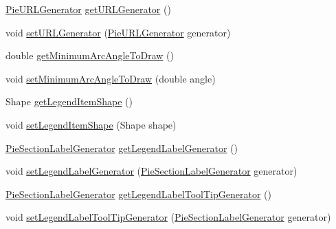 \begin{DoxyCompactItemize}
\item 
\mbox{\hyperlink{interfaceorg_1_1jfree_1_1chart_1_1urls_1_1_pie_u_r_l_generator}{Pie\+U\+R\+L\+Generator}} \mbox{\hyperlink{classorg_1_1jfree_1_1chart_1_1plot_1_1_pie_plot_a220bcaff244eda547e1c31db90ae60a8}{get\+U\+R\+L\+Generator}} ()
\item 
void \mbox{\hyperlink{classorg_1_1jfree_1_1chart_1_1plot_1_1_pie_plot_ab62afb77f16e5fe72a997e92a093da6d}{set\+U\+R\+L\+Generator}} (\mbox{\hyperlink{interfaceorg_1_1jfree_1_1chart_1_1urls_1_1_pie_u_r_l_generator}{Pie\+U\+R\+L\+Generator}} generator)
\item 
double \mbox{\hyperlink{classorg_1_1jfree_1_1chart_1_1plot_1_1_pie_plot_a6effce452c78c1047deb15a8b0fd0c45}{get\+Minimum\+Arc\+Angle\+To\+Draw}} ()
\item 
void \mbox{\hyperlink{classorg_1_1jfree_1_1chart_1_1plot_1_1_pie_plot_a1092c8623f27b65bb09368904b96ff4b}{set\+Minimum\+Arc\+Angle\+To\+Draw}} (double angle)
\item 
Shape \mbox{\hyperlink{classorg_1_1jfree_1_1chart_1_1plot_1_1_pie_plot_a1ad79d0ab422bb702082bc5bde4ff8e2}{get\+Legend\+Item\+Shape}} ()
\item 
void \mbox{\hyperlink{classorg_1_1jfree_1_1chart_1_1plot_1_1_pie_plot_a017e05045841e9e069d9ac5a50a7d5b1}{set\+Legend\+Item\+Shape}} (Shape shape)
\item 
\mbox{\hyperlink{interfaceorg_1_1jfree_1_1chart_1_1labels_1_1_pie_section_label_generator}{Pie\+Section\+Label\+Generator}} \mbox{\hyperlink{classorg_1_1jfree_1_1chart_1_1plot_1_1_pie_plot_a9045ce4cc30829ab6e83633a0c232299}{get\+Legend\+Label\+Generator}} ()
\item 
void \mbox{\hyperlink{classorg_1_1jfree_1_1chart_1_1plot_1_1_pie_plot_a254e74c5936f13ce22a9b0b1392deb7e}{set\+Legend\+Label\+Generator}} (\mbox{\hyperlink{interfaceorg_1_1jfree_1_1chart_1_1labels_1_1_pie_section_label_generator}{Pie\+Section\+Label\+Generator}} generator)
\item 
\mbox{\hyperlink{interfaceorg_1_1jfree_1_1chart_1_1labels_1_1_pie_section_label_generator}{Pie\+Section\+Label\+Generator}} \mbox{\hyperlink{classorg_1_1jfree_1_1chart_1_1plot_1_1_pie_plot_a21f044ff1f4be266a6a9cd4d34a549d6}{get\+Legend\+Label\+Tool\+Tip\+Generator}} ()
\item 
void \mbox{\hyperlink{classorg_1_1jfree_1_1chart_1_1plot_1_1_pie_plot_a2d4dcbf8f9fa0f63dac3a75d37b38fc5}{set\+Legend\+Label\+Tool\+Tip\+Generator}} (\mbox{\hyperlink{interfaceorg_1_1jfree_1_1chart_1_1labels_1_1_pie_section_label_generator}{Pie\+Section\+Label\+Generator}} generator)

\end{DoxyCompactItemize}

